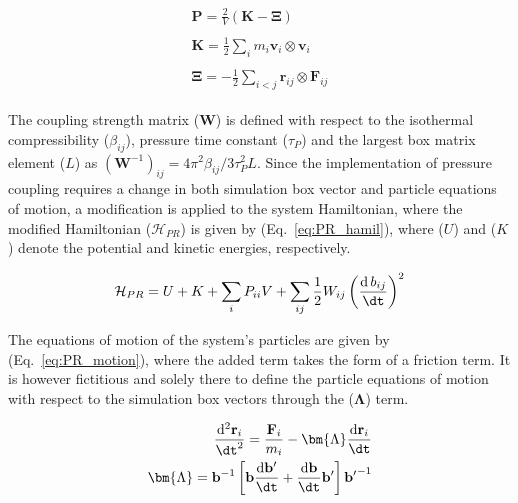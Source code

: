 \begin{subequations} \label{eq:virial}
\begin{align}
\begin{split}
    \mathbf{P} = \frac{2}{V}(\mathbf{K} - \bm{\Xi})
\end{split}\\
\begin{split}
    \mathbf{K} = \frac{1}{2}\sum_i m_i \mathbf{v}_i \otimes \mathbf{v}_i
\end{split}\\
\begin{split}
    \bm{\Xi} = -\frac{1}{2}\sum_{i<j} \mathbf{r}_{ij} \otimes \mathbf{F}_{ij} 
\end{split}
\end{align}
\end{subequations}

The coupling strength matrix ($\mathbf{W}$) is defined with respect to the isothermal compressibility ($\beta_{ij}$), pressure time constant ($\tau_P$) and the largest box matrix element ($L$) as $(\mathbf{W}^{-1})_{ij} = 4 \pi^2 \beta_{ij} / 3 \tau_P^2 L$. Since the implementation of pressure coupling requires a change in both simulation box vector and particle equations of motion, a modification is applied to the system Hamiltonian, where the modified Hamiltonian ($\mathcal{H}_{PR}$) is given by (Eq.~\ref{eq:PR_hamil}), where ($U$) and ($K$) denote the potential and kinetic energies, respectively. 

\begin{equation} \label{eq:PR_hamil}
    \mathcal{H}_{PR} = U + K + \sum_i P_{ii} V + \sum_{ij} \frac{1}{2} W_{ij} \left(\frac{\mathrm{d}\,b_{ij}}{\dt}\right)^2
\end{equation}

The equations of motion of the system's particles are given by (Eq.~\ref{eq:PR_motion}), where the added term takes the form of a friction term. It is however fictitious and solely there to define the particle equations of motion with respect to the simulation box vectors through the ($\bm{\Lambda}$) term.

\begin{subequations} \label{eq:PR_motion}
\begin{align}
\begin{split}
    \frac{\mathrm{d}^2 \mathbf{r}_i}{\dt^2} = \frac{\mathbf{F}_i}{m_i} - \bm{\Lambda} \frac{\mathrm{d} \mathbf{r}_i}{\dt}
\end{split}\\
\begin{split}
    \bm{\Lambda} = \mathbf{b}^{-1} \left[  \mathbf{b} \frac{\mathrm{d}\mathbf{b'}}{\dt} + \frac{\mathrm{d}\mathbf{b}}{\dt} \mathbf{b'} \right] \mathbf{b'}^{-1}
\end{split}
\end{align}
\end{subequations}

